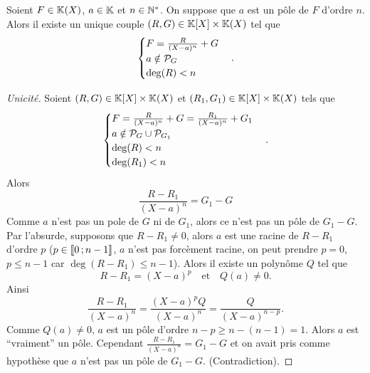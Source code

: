 \begin{lemme}
  Soient $F \in \K(X)$, $a \in \K$ et $n \in \N^*$. On suppose que $a$ est un pôle de $F$ d'ordre $n$. Alors il existe un unique couple $(R,G) \in \K[X] \times \K(X)$ tel que
  \begin{equation}
    \begin{cases} F = \frac{R}{(X-a)^n} +G \\ a\notin \P_G \\ \deg(R)<n \end{cases}.
  \end{equation}
\end{lemme}
\begin{proof}[Unicité]
  Soient $(R,G) \in \K[X] \times \K(X)$ et $(R_1,G_1) \in \K[X] \times \K(X)$ tels que
\begin{equation}
    \begin{cases} F = \frac{R}{(X-a)^n} +G=\frac{R_1}{(X-a)^n} +G_1 \\ a\notin \P_G\cup\P_{G_1} \\ \deg(R)<n \\ \deg(R_1)<n \end{cases}.
  \end{equation}
  Alors
  \begin{equation}
    \frac{R-R_1}{(X-a)^n}=G_1-G
  \end{equation}
  Comme $a$ n'est pas un pole de $G$ ni de $G_1$, alors ce n'est pas un pôle de $G_1-G$. Par l'absurde, supposons que $R-R_1\neq 0$, alors $a$ est une racine de $R-R_1$ d'ordre $p$ ($p \in \intervalleentier{0}{n-1}$, $a$ n'est pas forcèment racine, on peut prendre $p=0$, $p\leqslant n-1$ car $\deg(R-R_1)\leqslant n-1$). Alors il existe un polynôme $Q$ tel que
  \begin{equation}
    R-R_1=(X-a)^p \quad \text{et} \quad Q(a)\neq 0.
  \end{equation}
Ainsi
\begin{equation}
  \frac{R-R_1}{(X-a)^n} = \frac{(X-a)^pQ}{(X-a)^n} = \frac{Q}{(X-a)^{n-p}}.
\end{equation}
Comme $Q(a)\neq 0$, $a$ est un pôle d'ordre $n-p\geqslant n-(n-1)=1$. Alors $a$ est ``vraiment'' un pôle. Cependant $\frac{R-R_1}{(X-a)^n}=G_1-G$ et on avait pris comme hypothèse que $a$ n'est pas un pôle de $G_1-G$. (Contradiction).
\end{proof}
